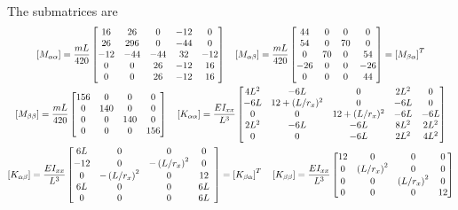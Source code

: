 \documentclass{AeroStructure-ERJohnson}
\begin{document}
\begin{example}
\begin{align}
\end{align}
The submatrices are
\begin{gather}
\left[M_{\alpha \alpha}\right]=\frac{m L}{420}\left[\begin{array}{@{}ccccc@{}}16 & 26 & 0 & -12 & 0 \\26 & 296 & 0 & -44 & 0 \\-12 & -44 & -44 & 32 & -12 \\0 & 0 & 26 & -12 & 16 \\0 & 0 & 26 & -12 & 16\end{array}\right]
\quad\left[M_{\alpha \beta}\right]=\frac{m L}{420}\left[\begin{array}{@{}cccc@{}}44 & 0 & 0 & 0 \\54 & 0 & 70 & 0 \\0 & 70 & 0 & 54 \\-26 & 0 & 0 & -26 \\0 & 0 & 0 & 44\end{array}\right]=\left[M_{\beta \alpha}\right]^{T}\label{ex18.5e}\\
\left[M_{\beta \beta}\right]=\frac{m L}{420}\left[\begin{array}{@{}cccc@{}}
156 & 0 & 0 & 0 \\
0 & 140 & 0 & 0 \\
0 & 0 & 140 & 0 \\
0 & 0 & 0 & 156 \\
\end{array}\right]
\quad\left[K_{\alpha \alpha}\right]
=\frac{EI_{xx}}{L^3}\left[\begin{array}{@{}ccccc@{}}
4L^2 & -6L & 0 & 2L^2  & 0\\
-6L & 12+(L/r_x)^2 & 0 & -6L & 0\\
0 & 0 & 12+(L/r_x)^2 & -6L & -6L \\
2L^2 & -6L & -6L & 8L^2 & 2L^2 \\
0 & 0 & -6L & 2L^2 & 4L^2\end{array}\right]\label{ex18.5f}\\
\left[K_{\alpha \beta}\right]=\frac{E I_{x x}}{L^{3}}\left[\begin{array}{@{}ccccc@{}}6 L & 0 & 0 & 0 \\-12 & 0 & -\left(L/ r_{x}\right)^{2} & 0 \\0 & -\left(L/r_{x}\right)^{2} & 0 & 12 \\6 L & 0 & 0 & 6 L \\0 & 0 & 0 & 6 L\end{array}\right]=\left[K_{\beta \alpha}\right]^{T} \quad\left[K_{\beta \beta}\right]=\frac{E I_{x x}}{L^{3}}\left[\begin{array}{@{}cccc@{}}12 & 0 & 0 & 0 \\0 & \left(L/r_{x}\right)^{2} & 0 & 0 \\0 & 0 & \left(L/ r_{x}\right)^{2} & 0 \\0 & 0 & 0 & 12\end{array}\right]\label{ex18.5g}\\

\end{gather}
\end{example}
\end{document}
